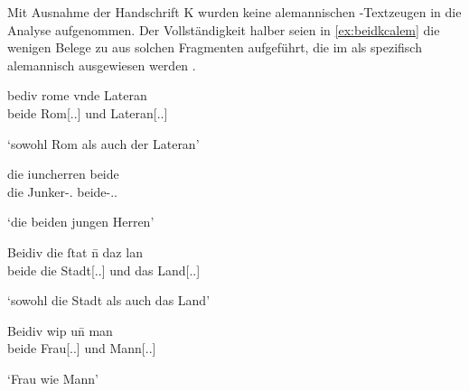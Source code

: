 Mit Ausnahme der Handschrift K wurden keine alemannischen
\KC{}-Textzeugen in die Analyse aufgenommen. Der Vollständigkeit halber
seien in \cref{ex:beidkcalem} die wenigen Belege zu  aus solchen
Fragmenten aufgeführt, die im \citet{hsc} als spezifisch alemannisch
ausgewiesen werden \autocite[vgl.][4, 44, 54]{wolf:kckat}.

\begin{exe}
\ex \label{ex:beidkcalem}
	\begin{xlist}
	\ex \gll bediv rome vnde Lateran \\ %
		     beide Rom[\Acc.\Sg.\NeutI] und Lateran[\Acc.\Sg.\MascI] \\
		\begin{taggedline}{\parencites[\pno~2\vb, 17]{kc:a11}[vgl.][5953]{schroeder1895}}
		\trans `sowohl Rom als auch der Lateran'
		\end{taggedline}

	\ex \gll die iuncherren beide \\ %
		     die Junker-\Nom.\Pl{} beide-\Nom.\Pl.\MascM{} \\
		\begin{taggedline}{\parencites[\pno~1\vb, 14]{kc:a14}[vgl.][1417]{schroeder1895}}
		\trans `die beiden jungen Herren'
		\end{taggedline}

	\ex \gll Beidiv die ſtat n̄ daz lan \\ %
		     beide die Stadt[\Acc.\Sg.\FemI] und das Land[\Acc.\Sg.\NeutI] \\
		\begin{taggedline}{\parencite[\pno~1\rb, 4]{kc:b1}}
		\trans `sowohl die Stadt als auch das Land'
		\end{taggedline}

	\ex \gll Beidiv wip un̄ man \\ %
		     beide Frau[\Nom.\Sg.\NeutF] und Mann[\Nom.\Sg.\MascM] \\
		\begin{taggedline}{\parencites[\pno~2\rb, 29]{kc:b1}[vgl.][619]{schroeder1895}}
		\trans `Frau wie Mann'
		\end{taggedline}
\end{xlist}
\end{exe}
